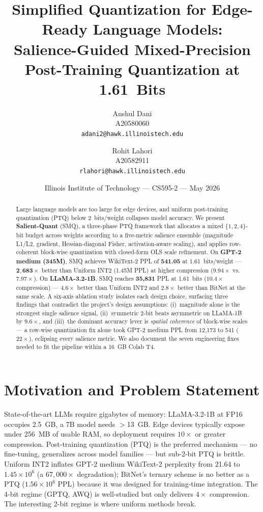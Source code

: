 \documentclass[11pt]{article}
\title{\vspace{-2em}Simplified Quantization for Edge-Ready Language Models:\\
Salience-Guided Mixed-Precision Post-Training Quantization at 1.61~Bits}
\author{Anshul Dani \\ \small A20580060 \\ \small \texttt{adani2@hawk.illinoistech.edu} \and
        Rohit Lahori \\ \small A20582911 \\ \small \texttt{rlahori@hawk.illinoistech.edu}}
\date{Illinois Institute of Technology --- CS595-2 --- May 2026}
\begin{document}
\maketitle
\vspace{-0.5em}

\begin{abstract}
\small
Large language models are too large for edge devices, and uniform post-training
quantization (PTQ) below 2~bits/weight collapses model accuracy.
We present \textbf{Salient-Quant} (SMQ), a three-phase PTQ framework that
allocates a mixed $\{1,2,4\}$-bit budget across weights according to a
five-metric salience ensemble (magnitude L1/L2, gradient, Hessian-diagonal Fisher,
activation-aware scaling), and applies row-coherent block-wise quantization with
closed-form OLS scale refinement.
On \textbf{GPT-2 medium (345M)}, SMQ achieves WikiText-2 PPL of \textbf{541.05} at 1.61~bits/weight ---
$\mathbf{2{,}683\times}$ better than Uniform INT2 (1.45M PPL) at higher compression ($9.94\times$ vs.\ $7.97\times$).
On \textbf{LLaMA-3.2-1B}, SMQ reaches \textbf{35{,}831} PPL at 1.61~bits ($10.4\times$ compression) ---
$4.6\times$ better than Uniform INT2 and $2.8\times$ better than BitNet at the same scale.
A six-axis ablation study isolates each design choice, surfacing three findings that contradict
the project's design assumptions: (i)~magnitude alone is the strongest single salience signal,
(ii)~symmetric 2-bit beats asymmetric on LLaMA-1B by $9.6\times$, and (iii)~the dominant
accuracy lever is \emph{spatial coherence} of block-wise scales --- a row-wise quantization
fix alone took GPT-2 medium PPL from 12{,}173 to 541 ($22\times$), eclipsing every salience
metric.
We also document the seven engineering fixes needed to fit the pipeline within a 16~GB
Colab T4.
\end{abstract}

\section{Motivation and Problem Statement}
\label{sec:intro}

State-of-the-art LLMs require gigabytes of memory: LLaMA-3.2-1B at FP16 occupies 2.5~GB,
a 7B model needs $>$13~GB.
Edge devices typically expose under 256~MB of usable RAM, so deployment requires
$10\times$ or greater compression.
Post-training quantization (PTQ) is the preferred mechanism --- no fine-tuning, generalizes
across model families --- but sub-2-bit PTQ is brittle.
Uniform INT2 inflates GPT-2 medium WikiText-2 perplexity from 21.64 to $1.45\times 10^6$
(a $67{,}000\times$ degradation); BitNet's ternary scheme is no better as a PTQ
($1.56\times 10^6$ PPL) because it was designed for training-time integration.
The 4-bit regime (GPTQ, AWQ) is well-studied but only delivers $4\times$ compression.
The interesting 2-bit regime is where uniform methods break.
\end{document}
